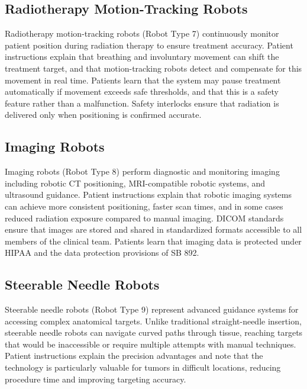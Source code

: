 \subsection{Radiotherapy Motion-Tracking Robots}
\label{subsec:instructions-rt-tracking}

Radiotherapy motion-tracking robots (Robot Type 7) continuously monitor patient
position during radiation therapy to ensure treatment accuracy. Patient
instructions explain that breathing and involuntary movement can shift the
treatment target, and that motion-tracking robots detect and compensate for
this movement in real time. Patients learn that the system may pause treatment
automatically if movement exceeds safe thresholds, and that this is a safety
feature rather than a malfunction. Safety interlocks ensure that radiation is
delivered only when positioning is confirmed accurate.

\subsection{Imaging Robots}
\label{subsec:instructions-imaging}

Imaging robots (Robot Type 8) perform diagnostic and monitoring imaging
including robotic CT positioning, MRI-compatible robotic systems, and
ultrasound guidance. Patient instructions explain that robotic imaging systems
can achieve more consistent positioning, faster scan times, and in some cases
reduced radiation exposure compared to manual imaging. DICOM \cite{dicom}
standards ensure that images are stored and shared in standardized formats
accessible to all members of the clinical team. Patients learn that imaging
data is protected under HIPAA \cite{hipaa} and the data protection provisions
of SB 892.

\subsection{Steerable Needle Robots}
\label{subsec:instructions-steerable}

Steerable needle robots (Robot Type 9) represent advanced guidance systems for
accessing complex anatomical targets. Unlike traditional straight-needle
insertion, steerable needle robots can navigate curved paths through tissue,
reaching targets that would be inaccessible or require multiple attempts with
manual techniques. Patient instructions explain the precision advantages and
note that the technology is particularly valuable for tumors in difficult
locations, reducing procedure time and improving targeting accuracy.

